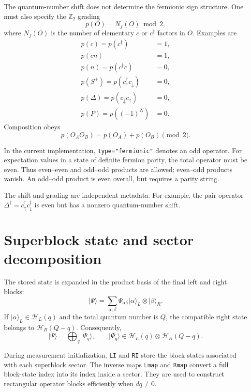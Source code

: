 \documentclass[11pt,a4paper]{article}
\newcommand{\ket}[1]{\lvert #1\rangle}
\newcommand{\Hil}{\mathcal H}
\begin{document}
The quantum-number shift does not determine the fermionic sign structure.
One must also specify the $\mathbb Z_2$ grading
\begin{equation}
  p(O)=N_f(O)\bmod 2,
\end{equation}
where $N_f(O)$ is the number of elementary $c$ or $c^\dagger$ factors in $O$.
Examples are
\begin{align}
  p(c)=p(c^\dagger)&=1,\\
  p(cn)&=1,\\
  p(n)=p(c^\dagger c)&=0,\\
  p(S^+)=p(c^\dagger_\uparrow c_\downarrow)&=0,\\
  p(\Delta)=p(c_\downarrow c_\uparrow)&=0,\\
  p(P)=p((-1)^N)&=0.
\end{align}
Composition obeys
\begin{equation}
  p(O_AO_B)=p(O_A)+p(O_B)\pmod 2.
\end{equation}

In the current implementation, \texttt{type="fermionic"} denotes an odd
operator.  For expectation values in a state of definite fermion parity,
the total operator must be even.  Thus even--even and odd--odd products are
allowed; even--odd products vanish.  An odd--odd product is even overall, but
requires a parity string.

The shift and grading are independent metadata.  For example, the pair
operator $\Delta^\dagger=c^\dagger_\uparrow c^\dagger_\downarrow$ is even but
has a nonzero quantum-number shift.

\section{Superblock state and sector decomposition}

The stored state is expanded in the product basis of the final left and right
blocks:
\begin{equation}
  \ket{\Psi}
  =\sum_{\alpha,\beta}\Psi_{\alpha\beta}
   \ket{\alpha}_L\otimes\ket{\beta}_R.
\end{equation}
If $\ket{\alpha}_L\in\Hil_L(q)$ and the total quantum number is $Q$, the
compatible right state belongs to $\Hil_R(Q-q)$.  Consequently,
\begin{equation}
  \ket{\Psi}=\bigoplus_q\ket{\Psi_q},
  \qquad
  \ket{\Psi_q}\in\Hil_L(q)\otimes\Hil_R(Q-q).
\end{equation}

During measurement initialization, \texttt{LI} and \texttt{RI} store the
block states associated with each superblock sector.  The inverse maps
\texttt{Lmap} and \texttt{Rmap} convert a full block-state index into its
index inside a sector.  They are used to construct rectangular operator
blocks efficiently when $dq\ne0$.
\end{document}
